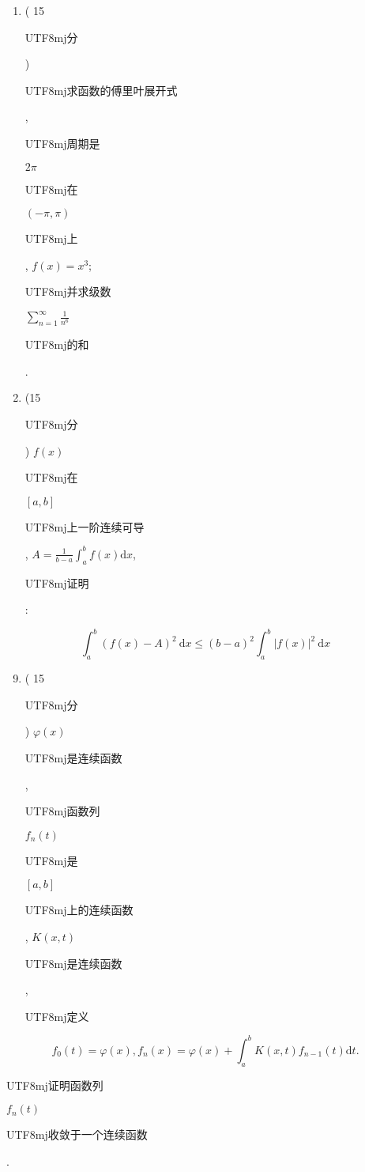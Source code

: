 \documentclass[10pt]{article}
\begin{document}
\begin{enumerate}
  \item ( 15 \begin{CJK}{UTF8}{mj}分\end{CJK}) \begin{CJK}{UTF8}{mj}求函数的傅里叶展开式\end{CJK}, \begin{CJK}{UTF8}{mj}周期是\end{CJK} $2 \pi$ \begin{CJK}{UTF8}{mj}在\end{CJK} $(-\pi, \pi)$ \begin{CJK}{UTF8}{mj}上\end{CJK}, $f(x)=x^{3}$; \begin{CJK}{UTF8}{mj}并求级数\end{CJK} $\sum_{n=1}^{\infty} \frac{1}{n^{6}}$ \begin{CJK}{UTF8}{mj}的和\end{CJK}.

  \item (15 \begin{CJK}{UTF8}{mj}分\end{CJK}) $f(x)$ \begin{CJK}{UTF8}{mj}在\end{CJK} $[a, b]$ \begin{CJK}{UTF8}{mj}上一阶连续可导\end{CJK}, $A=\frac{1}{b-a} \int_{a}^{b} f(x) \mathrm{d} x$, \begin{CJK}{UTF8}{mj}证明\end{CJK}:

\end{enumerate}
$$
\int_{a}^{b}(f(x)-A)^{2} \mathrm{~d} x \leqslant(b-a)^{2} \int_{a}^{b}|f(x)|^{2} \mathrm{~d} x
$$

\begin{enumerate}
  \setcounter{enumi}{8}
  \item ( 15 \begin{CJK}{UTF8}{mj}分\end{CJK}) $\varphi(x)$ \begin{CJK}{UTF8}{mj}是连续函数\end{CJK}, \begin{CJK}{UTF8}{mj}函数列\end{CJK} $f_{n}(t)$ \begin{CJK}{UTF8}{mj}是\end{CJK} $[a, b]$ \begin{CJK}{UTF8}{mj}上的连续函数\end{CJK}, $K(x, t)$ \begin{CJK}{UTF8}{mj}是连续函数\end{CJK}, \begin{CJK}{UTF8}{mj}定义\end{CJK}
\end{enumerate}
$$
f_{0}(t)=\varphi(x), f_{n}(x)=\varphi(x)+\int_{a}^{b} K(x, t) f_{n-1}(t) \mathrm{d} t .
$$
\begin{CJK}{UTF8}{mj}证明函数列\end{CJK} $f_{n}(t)$ \begin{CJK}{UTF8}{mj}收敛于一个连续函数\end{CJK}.
\end{document}
